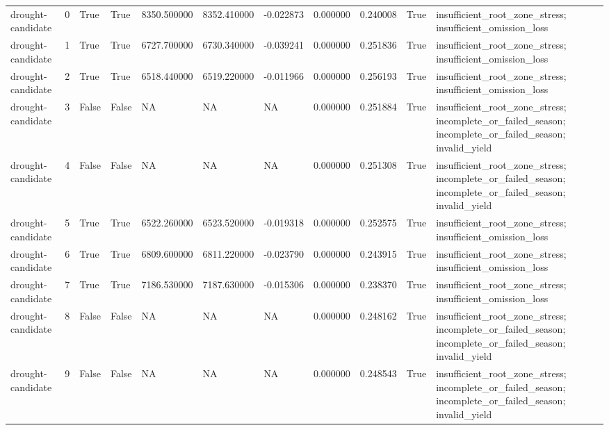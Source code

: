 {\begin{tabular}{lllllllllll}
drought-candidate & 0 & True & True & 8350.500000 & 8352.410000 & -0.022873 & 0.000000 & 0.240008 & True & insufficient\_root\_zone\_stress; insufficient\_omission\_loss \\
drought-candidate & 1 & True & True & 6727.700000 & 6730.340000 & -0.039241 & 0.000000 & 0.251836 & True & insufficient\_root\_zone\_stress; insufficient\_omission\_loss \\
drought-candidate & 2 & True & True & 6518.440000 & 6519.220000 & -0.011966 & 0.000000 & 0.256193 & True & insufficient\_root\_zone\_stress; insufficient\_omission\_loss \\
drought-candidate & 3 & False & False & NA & NA & NA & 0.000000 & 0.251884 & True & insufficient\_root\_zone\_stress; incomplete\_or\_failed\_season; incomplete\_or\_failed\_season; invalid\_yield \\
drought-candidate & 4 & False & False & NA & NA & NA & 0.000000 & 0.251308 & True & insufficient\_root\_zone\_stress; incomplete\_or\_failed\_season; incomplete\_or\_failed\_season; invalid\_yield \\
drought-candidate & 5 & True & True & 6522.260000 & 6523.520000 & -0.019318 & 0.000000 & 0.252575 & True & insufficient\_root\_zone\_stress; insufficient\_omission\_loss \\
drought-candidate & 6 & True & True & 6809.600000 & 6811.220000 & -0.023790 & 0.000000 & 0.243915 & True & insufficient\_root\_zone\_stress; insufficient\_omission\_loss \\
drought-candidate & 7 & True & True & 7186.530000 & 7187.630000 & -0.015306 & 0.000000 & 0.238370 & True & insufficient\_root\_zone\_stress; insufficient\_omission\_loss \\
drought-candidate & 8 & False & False & NA & NA & NA & 0.000000 & 0.248162 & True & insufficient\_root\_zone\_stress; incomplete\_or\_failed\_season; incomplete\_or\_failed\_season; invalid\_yield \\
drought-candidate & 9 & False & False & NA & NA & NA & 0.000000 & 0.248543 & True & insufficient\_root\_zone\_stress; incomplete\_or\_failed\_season; incomplete\_or\_failed\_season; invalid\_yield \\
\end{tabular}%
}

